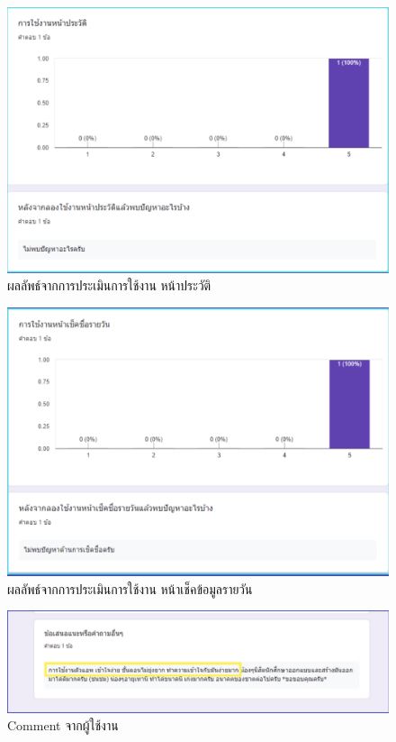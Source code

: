 \begin{figure}
  \begin{center}
    \includegraphics[width=\linewidth]{images/eval2.png}
  \end{center}
  \caption[Poem]{ผลลัพธ์จากการประเมินการใช้งาน หน้าประวัติ}
  \label{fig:Eval2}
\end{figure}

\begin{figure}
  \begin{center}
    \includegraphics[width=\linewidth]{images/eval3.png}
  \end{center}
  \caption[Poem]{ผลลัพธ์จากการประเมินการใช้งาน หน้าเช็คข้อมูลรายวัน}
  \label{fig:Eval3}
\end{figure}

\begin{figure}
  \begin{center}
    \includegraphics[width=\linewidth]{images/eval4.png}
  \end{center}
  \caption[Poem]{Comment จากผู้ใช้งาน}
  \label{fig:Eval4}
\end{figure}




